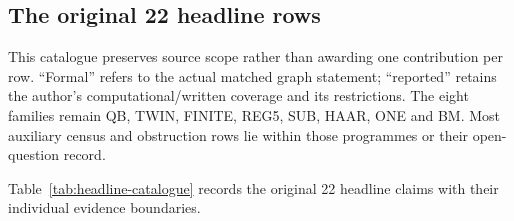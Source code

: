 \documentclass[smallextended]{svjour3}
\begin{document}
\subsection{The original 22 headline
rows}\label{the-original-22-headline-rows}

This catalogue preserves source scope rather than awarding one
contribution per row. ``Formal'' refers to the actual matched graph
statement; ``reported'' retains the author's computational/written
coverage and its restrictions. The eight families remain QB, TWIN,
FINITE, REG5, SUB, HAAR, ONE and BM. Most auxiliary census and
obstruction rows lie within those programmes or their open-question
record.

Table~\ref{tab:headline-catalogue} records the original 22 headline claims with their individual evidence boundaries.
\end{document}
